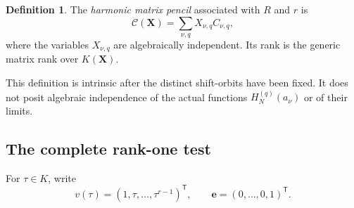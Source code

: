 \documentclass[11pt,letterpaper]{article}
\numberwithin{equation}{section}
\theoremstyle{definition}\newtheorem{definition}[theorem]{Definition}
\theoremstyle{remark}\newtheorem{remark}[theorem]{Remark}
\newcommand{\ee}{\bm e}
\begin{document}
\begin{definition}
The \emph{harmonic matrix pencil} associated with $R$ and $r$ is
\begin{equation}\label{eq:harmonic-pencil}
 \mathscr C(\bm X)=\sum_{\nu,q}X_{\nu,q}C_{\nu,q},
\end{equation}
where the variables $X_{\nu,q}$ are algebraically independent. Its rank
is the generic matrix rank over $K(\bm X)$.
\end{definition}
This definition is intrinsic after the distinct shift-orbits have been
fixed. It does not posit algebraic independence of the actual functions
$H_N^{(q)}(a_\nu)$ or of their limits.

\subsection{The complete rank-one test}
For $\tau\in K$, write
\[
 v(\tau)=(1,\tau,\ldots,\tau^{r-1})^{\mathsf T},\qquad
 \ee=(0,\ldots,0,1)^{\mathsf T}.
\]
\end{document}
